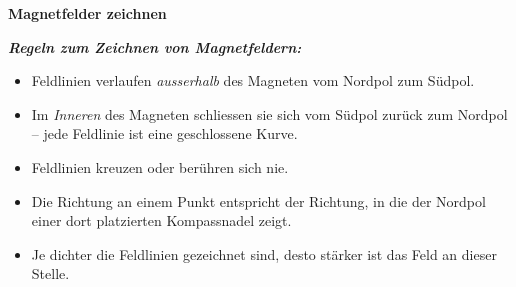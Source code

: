 \documentclass[addpoints,11pt,a4paper]{exam}
\newenvironment{theoriebox}[1][Theorie]{%
  \par\addvspace{10pt}\noindent\textbf{#1}\par\smallskip\noindent
}{%
  \par\addvspace{10pt}
}
\begin{document}
\begin{theoriebox}[Magnetfelder zeichnen]
\textbf{\emph{Regeln zum Zeichnen von Magnetfeldern:}}
\begin{itemize}[leftmargin=1.2cm,itemsep=0.2em]
  \item Feldlinien verlaufen \emph{ausserhalb} des Magneten vom Nordpol zum Südpol.
  \item Im \emph{Inneren} des Magneten schliessen sie sich vom Südpol zurück zum Nordpol -- jede Feldlinie ist eine geschlossene Kurve.
  \item Feldlinien kreuzen oder berühren sich nie.
  \item Die Richtung an einem Punkt entspricht der Richtung, in die der Nordpol einer dort platzierten Kompassnadel zeigt.
  \item Je dichter die Feldlinien gezeichnet sind, desto stärker ist das Feld an dieser Stelle.
\end{itemize}
\end{theoriebox}
\end{document}

